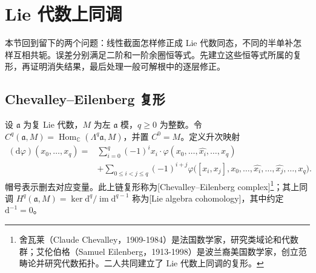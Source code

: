 
\section{Lie 代数上同调}
\label{b5:sec:2003}

%
%

本节回到留下的两个问题：线性截面怎样修正成 Lie 代数同态，不同的半单补怎样互相共轭。误差分别满足二阶和一阶余圈恒等式。先建立这些恒等式所属的复形，再证明消失结果，最后处理一般可解根中的逐层修正。

\subsection{Chevalley–Eilenberg 复形}
\label{b5:subsec:2003:01}

\begin{definition}\label{b5:def:chevalley-eilenberg}
	设 \(\mathfrak a\) 为复 Lie 代数，\(M\) 为左 \(\mathfrak a\) 模，\(q\ge0\) 为整数。令 \(C^q(\mathfrak a,M)=\operatorname{Hom}_{\mathbb C}(\Lambda^q\mathfrak a,M)\)，并置 \(C^0=M\)。定义升次映射
	\begin{align*}
		(\mathrm{d}\varphi)(x_0,\ldots,x_q) ={}&\sum_{i=0}^q(-1)^i x_i\cdot \varphi(x_0,\ldots,\widehat{x_i},\ldots,x_q)\\
		&+\sum_{0\le i<j\le q}(-1)^{i+j} \varphi\bigl([x_i,x_j],x_0,\ldots,\widehat{x_i},\ldots, \widehat{x_j},\ldots,x_q\bigr).
	\end{align*}
	帽号表示删去对应变量。此上链复形称为[Chevalley--Eilenberg complex]\footnote{舍瓦莱（Claude Chevalley，1909-1984）是法国数学家，研究类域论和代数群；艾伦伯格（Samuel Eilenberg，1913-1998）是波兰裔美国数学家，创立范畴论并研究代数拓扑。二人共同建立了 Lie 代数上同调的复形。}；其上同调 \(H^q(\mathfrak a,M)=\ker \mathrm{d}^q/\operatorname{im}\mathrm{d}^{q-1}\) 称为[Lie algebra cohomology]，其中约定 \(\mathrm{d}^{-1}=0\)。
\end{definition}


